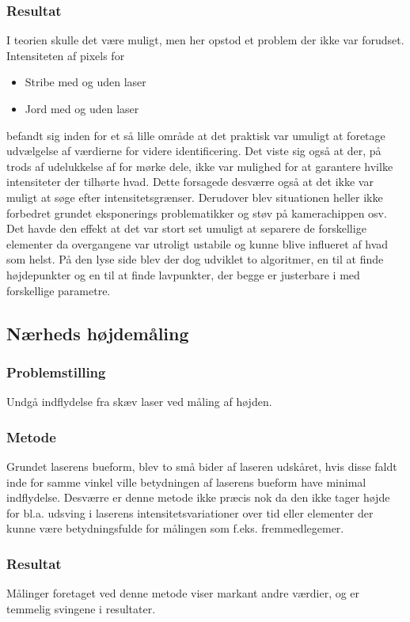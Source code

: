 \subsubsection{Resultat}
I teorien skulle det være muligt, men her opstod et problem der ikke var forudset. Intensiteten af pixels for
\begin{itemize}
	\item Stribe med og uden laser
	\item Jord med og uden laser
\end{itemize}
befandt sig inden for et så lille område at det praktisk var umuligt at foretage udvælgelse af værdierne for videre identificering. Det viste sig også at der, på trods af udelukkelse af for mørke dele, ikke var mulighed for at garantere hvilke intensiteter der tilhørte hvad. Dette forsagede desværre også at det ikke var muligt at søge efter intensitetsgrænser.
Derudover blev situationen heller ikke forbedret grundet eksponerings problematikker og støv på kamerachippen osv.
Det havde den effekt at det var stort set umuligt at separere de forskellige elementer da overgangene var utroligt ustabile og kunne blive influeret af hvad som helst. På den lyse side blev der dog udviklet to algoritmer, en til at finde højdepunkter og en til at finde lavpunkter, der begge er justerbare i med forskellige parametre.

\subsection{Nærheds højdemåling}
\subsubsection{Problemstilling}
Undgå indflydelse fra skæv laser ved måling af højden.

\subsubsection{Metode}
Grundet laserens bueform, blev to små bider af laseren udskåret, hvis disse faldt inde for samme vinkel ville betydningen af laserens bueform have minimal indflydelse. Desværre er denne metode ikke præcis nok da den ikke tager højde for bl.a. udsving i laserens intensitetsvariationer over tid eller elementer der kunne være betydningsfulde for målingen som f.eks. fremmedlegemer.

\subsubsection{Resultat}
Målinger foretaget ved denne metode viser markant andre værdier, og er temmelig svingene i resultater.
